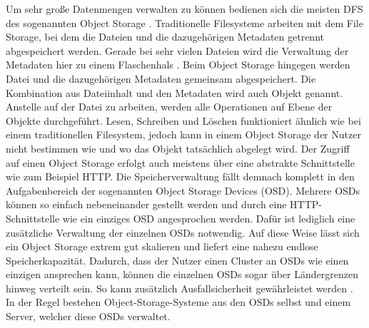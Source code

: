 \documentclass[12pt,oneside,a4paper,parskip]{scrbook}
\begin{document}
Um sehr große Datenmengen verwalten zu können bedienen sich die meisten DFS des sogenannten Object Storage \cite{cephPaper}. Traditionelle Filesysteme arbeiten mit dem File Storage, bei dem die Dateien und die dazugehörigen Metadaten getrennt abgespeichert werden. Gerade bei sehr vielen Dateien wird die Verwaltung der Metadaten hier zu einem Flaschenhals \cite{filestorage}. Beim Object Storage hingegen werden Datei und die dazugehörigen Metadaten gemeinsam abgespeichert. Die Kombination aus Dateiinhalt und den Metadaten wird auch Objekt genannt. Anstelle auf der Datei zu arbeiten, werden alle Operationen auf Ebene der Objekte durchgeführt. Lesen, Schreiben und Löschen funktioniert ähnlich wie bei einem traditionellen Filesystem, jedoch kann in einem Object Storage der Nutzer nicht bestimmen wie und wo das Objekt tatsächlich abgelegt wird. Der Zugriff auf einen Object Storage erfolgt auch meistens über eine abstrakte Schnittstelle wie zum Beispiel HTTP. Die Speicherverwaltung fällt demnach komplett in den Aufgabenbereich der sogenannten Object Storage Devices (OSD). Mehrere OSDs können so einfach nebeneinander gestellt werden und durch eine HTTP-Schnittstelle wie ein einziges OSD angesprochen werden. Dafür ist lediglich eine zusätzliche Verwaltung der einzelnen OSDs notwendig. Auf diese Weise lässt sich ein Object Storage extrem gut skalieren und liefert eine nahezu endlose Speicherkapazität. Dadurch, dass der Nutzer einen Cluster an OSDs wie einen einzigen ansprechen kann, können die einzelnen OSDs sogar über Ländergrenzen hinweg verteilt sein. So kann zusätzlich Ausfallsicherheit gewährleistet werden \cite{osvideo}\cite{objectstorage}\cite{objectBasedStorage}. In der Regel bestehen Object-Storage-Systeme aus den OSDs selbst und einem Server, welcher diese OSDs verwaltet.
\end{document}
